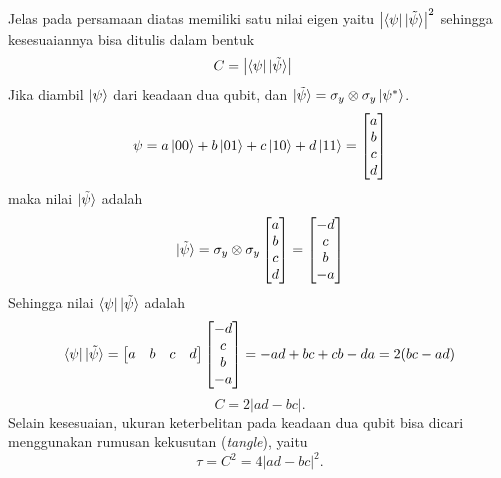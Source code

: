 Jelas pada persamaan diatas memiliki satu nilai eigen yaitu $\left|\bra{\psi} \ket{\tilde{\psi}}\right|^2$ sehingga kesesuaiannya bisa ditulis dalam bentuk 
\begin{align*}
	C &= \left|\bra{\psi} \ket{\tilde{\psi}}\right|
\end{align*}
Jika diambil $\ket{\psi}$ dari keadaan dua qubit, dan $\ket{\tilde{\psi}} = \sigma_y \otimes \sigma_y \ket{\psi^*}$.
\[ \psi = a\ket{00} + b\ket{01} + c\ket{10} + d\ket{11} = \begin{bmatrix}
	a \\ b \\ c \\ d    
\end{bmatrix}\]
maka nilai $\ket{\tilde{\psi}}$ adalah
\begin{equation*}
	\ket{\tilde{\psi}} = \sigma_y \otimes \sigma_y \begin{bmatrix}
		a \\ b \\ c \\ d    \end{bmatrix} = \begin{bmatrix}-d \\ c \\ b \\ -a    
	\end{bmatrix}
\end{equation*}
Sehingga nilai $\bra{\psi} \ket{\tilde{\psi}}$ adalah
\begin{equation*}
	\bra{\psi} \ket{\tilde{\psi}} = \begin{bmatrix}
		a & b & c & d    
	\end{bmatrix} \begin{bmatrix}-d \\ c \\ b \\ -a    
	\end{bmatrix} = -ad + bc + cb - da = 2(bc - ad)
\end{equation*}
\begin{equation}
	C = 2|ad - bc|\label{detC}.
\end{equation}
Selain kesesuaian, ukuran keterbelitan pada keadaan dua qubit bisa dicari menggunakan rumusan kekusutan (\textit{tangle}), yaitu
\begin{equation*}
	\tau = C^2 = 4|ad - bc|^2. \label{tangle2qubit}
\end{equation*}

